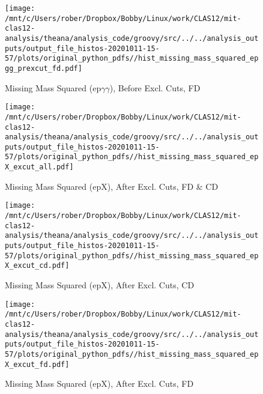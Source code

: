 \documentclass{article}
\begin{document}
\begin{landscape}
    \begin{figure}[h]
        \centering

        \texttt{[image: /mnt/c/Users/rober/Dropbox/Bobby/Linux/work/CLAS12/mit-clas12-analysis/theana/analysis\_code/groovy/src/../../analysis\_outputs/output\_file\_histos-20201011-15-57/plots/original\_python\_pdfs//hist\_missing\_mass\_squared\_epgg\_prexcut\_fd.pdf]}
        \captionsetup{textformat=empty,labelformat=blank}
        \caption{Missing Mass Squared (ep$\gamma$$\gamma$), Before Excl. Cuts, FD}
    \end{figure}
    \clearpage
    
    \begin{figure}[h]
        \centering

        \texttt{[image: /mnt/c/Users/rober/Dropbox/Bobby/Linux/work/CLAS12/mit-clas12-analysis/theana/analysis\_code/groovy/src/../../analysis\_outputs/output\_file\_histos-20201011-15-57/plots/original\_python\_pdfs//hist\_missing\_mass\_squared\_epX\_excut\_all.pdf]}
        \captionsetup{textformat=empty,labelformat=blank}
        \caption{Missing Mass Squared (epX), After Excl. Cuts, FD \& CD}
    \end{figure}
    \clearpage
    
    \begin{figure}[h]
        \centering

        \texttt{[image: /mnt/c/Users/rober/Dropbox/Bobby/Linux/work/CLAS12/mit-clas12-analysis/theana/analysis\_code/groovy/src/../../analysis\_outputs/output\_file\_histos-20201011-15-57/plots/original\_python\_pdfs//hist\_missing\_mass\_squared\_epX\_excut\_cd.pdf]}
        \captionsetup{textformat=empty,labelformat=blank}
        \caption{Missing Mass Squared (epX), After Excl. Cuts, CD}
    \end{figure}
    \clearpage
    
    \begin{figure}[h]
        \centering

        \texttt{[image: /mnt/c/Users/rober/Dropbox/Bobby/Linux/work/CLAS12/mit-clas12-analysis/theana/analysis\_code/groovy/src/../../analysis\_outputs/output\_file\_histos-20201011-15-57/plots/original\_python\_pdfs//hist\_missing\_mass\_squared\_epX\_excut\_fd.pdf]}
        \captionsetup{textformat=empty,labelformat=blank}
        \caption{Missing Mass Squared (epX), After Excl. Cuts, FD}
    \end{figure}
    \clearpage
    
    \begin{figure}[h]
        \centering


\end{figure}
\end{landscape}
\end{document}
